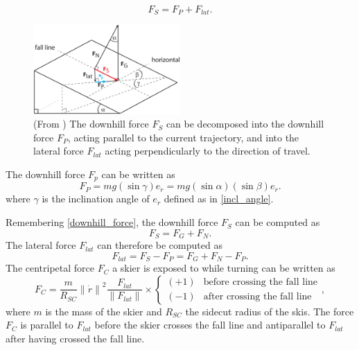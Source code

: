 \documentclass[12pt,a4paper,twoside]{book}
\newcommand{\norm}[1]{\lVert#1\rVert}
\begin{document}
\begin{equation}
F_S=F_P+F_{lat}.
\end{equation}
\begin{figure}
  \begin{center}
    \includegraphics[width=0.5\textwidth]{images/figure5.eps}
    \caption{(From \cite{hol2012}) The downhill force $F_S$ can be decomposed into the downhill force $F_P$, acting parallel to the current trajectory, and into the lateral force $F_{lat}$ acting perpendicularly to the direction of travel.}\label{downhill_force_pic}
  \end{center}
\end{figure}

The downhill force $F_p$ can be written as
\begin{equation}
F_P=mg ( \sin \gamma ) e_{\dot{r}}=mg ( \sin \alpha ) ( \sin \beta ) e_{\dot{r}}.
\end{equation}
where $\gamma$ is the inclination angle of $e_{\dot{r}}$ defined as in \ref{incl_angle}.

Remembering \ref{downhill_force}, the downhill force $F_S$ can be computed as
\begin{equation}
F_S=F_G+F_N.
\end{equation}
The lateral force $F_{lat}$ can therefore be computed as
\begin{equation}
F_{lat}=F_S-F_P=F_G+F_N-F_P.
\end{equation}
The centripetal force $F_C$ a skier is exposed to while turning can be written as
\begin{equation}
F_C=\frac{m}{R_{SC}} {\norm{\dot{r}}}^2 \frac{F_{lat}}{\norm{F_{lat}}} \times
\begin{cases}
  (+1) & \text{before crossing the fall line} \\
  (-1) & \text{after crossing the fall line}
  \end{cases},
\end{equation}
where $m$ is the mass of the skier and $R_{SC}$ the sidecut radius of the skis. The force $F_C$ is parallel to $F_{lat}$ before the skier crosses the fall line and antiparallel to $F_{lat}$ after having crossed the fall line.
\end{document}
